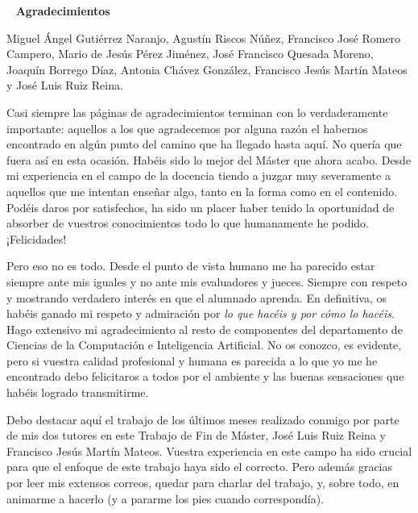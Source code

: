 \documentclass[a4paper,10pt]{article}
\begin{document}
\newpage
\thispagestyle{empty}
\ 
\newpage
\thispagestyle{empty}
\LARGE
\textbf{Agradecimientos }
\par \vspace{24pt}
\normalsize

Miguel Ángel Gutiérrez Naranjo, Agustín Riscos Núñez, Francisco José Romero Campero, Mario de Jesús Pérez Jiménez, José Francisco Quesada Moreno, Joaquín Borrego Díaz, Antonia Chávez González, Francisco Jesús Martín Mateos y José Luis Ruiz Reina. 

\par\vspace{10pt}

Casi siempre las páginas de agradecimientos terminan con lo verdaderamente importante: aquellos a los que agradecemos por alguna razón el habernos encontrado en algún punto del camino que ha llegado hasta aquí. No quería que fuera así en esta ocasión. Habéis sido lo mejor del Máster que ahora acabo. Desde mi experiencia en el campo de la docencia tiendo a juzgar muy severamente a aquellos que me intentan enseñar algo, tanto en la forma como en el contenido. Podéis daros por satisfechos, ha sido un placer haber tenido la oportunidad de absorber de vuestros conocimientos todo lo que humanamente he podido. ¡Felicidades!

\par\vspace{10pt}

Pero eso no es todo. Desde el punto de vista humano me ha parecido estar siempre ante mis iguales y no ante mis evaluadores y jueces. Siempre con respeto y mostrando verdadero interés en que el alumnado aprenda. En definitiva, os habéis ganado mi respeto y admiración por \emph{lo que hacéis y por cómo lo hacéis}. Hago extensivo mi agradecimiento al resto de componentes del departamento de Ciencias de la Computación e Inteligencia Artificial. No os conozco, es evidente, pero si vuestra calidad profesional y humana es parecida a lo que yo me he encontrado debo felicitaros a todos por el ambiente y las buenas sensaciones que habéis logrado transmitirme.

\par\vspace{10pt}

Debo destacar aquí el trabajo de los últimos meses realizado conmigo por parte de mis dos tutores en este Trabajo de Fin de Máster, José Luis Ruiz Reina y Francisco Jesús Martín Mateos. Vuestra experiencia en este campo ha sido crucial para que el enfoque de este trabajo haya sido el correcto. Pero además gracias por leer mis extensos correos, quedar para charlar del trabajo, y, sobre todo, en animarme a hacerlo (y a pararme los pies cuando correspondía). 
\end{document}
